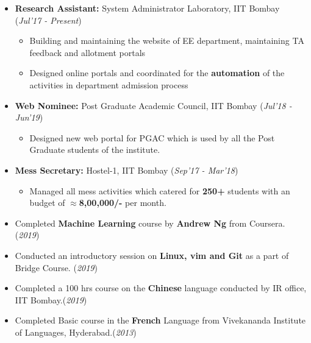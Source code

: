 \documentclass[10pt]{article}
\begin{document}
\begin{itemize}[leftmargin=0.4cm]


\item \textbf {Research Assistant:} System Administrator Laboratory, IIT Bombay \hfill{(\textit{Jul'17 - Present})}
\begin{itemize}
    \item Building and maintaining the website of EE department, maintaining TA feedback and allotment portals
    \item Designed online portals and coordinated for the \textbf{automation} of the activities in department admission process
\end{itemize}
    


\item \textbf{Web Nominee:} Post Graduate Academic Council, IIT Bombay \hfill{(\textit{Jul'18 - Jun'19})}
\begin{itemize}
	\item Designed new web portal for PGAC which is used by all the Post Graduate students of the institute. 
\end{itemize}

\item \textbf{Mess Secretary:}  Hostel-1, IIT Bombay   \hfill{(\textit{Sep'17 - Mar'18})}
\begin{itemize}
	\item Managed all mess activities which catered for \textbf{250+} students with an budget of \textbf{$\approx$8,00,000/-} per month.
\end{itemize}


\end{itemize}
%

\colorbox{bl}{} 

\begin{itemize}[leftmargin=0.4cm]
    \item { Completed \textbf{Machine Learning} course by \textbf{Andrew Ng} from Coursera. }\hfill{(\textit{2019})}
    \item {Conducted an introductory session on \textbf{Linux, vim and Git} as a part of Bridge Course. }\hfill{(\textit{2019})}
    \item {Completed a 100 hrs course on the \textbf{Chinese} language conducted by IR office, IIT Bombay.}\hfill{(\textit{2019})}
    \item {Completed Basic course in the \textbf{French} Language from Vivekananda Institute of Languages, Hyderabad.}\hfill{(\textit{2013})}
\end{itemize}

\end{document}
